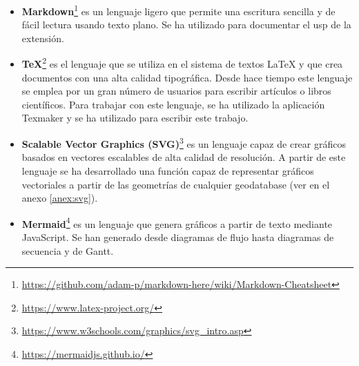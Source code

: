 \begin{itemize}
\item\textbf{Markdown}\footnote{\url{https://github.com/adam-p/markdown-here/wiki/Markdown-Cheatsheet}} es un lenguaje ligero que permite una escritura sencilla y de fácil lectura usando texto plano. Se ha utilizado para documentar el usp de la extensión.
\item\textbf{TeX}\footnote{\url{https://www.latex-project.org/}} es el lenguaje que se utiliza en el sistema de textos LaTeX y que crea documentos con una alta calidad tipográfica. Desde hace tiempo este lenguaje se emplea por un gran número de usuarios para escribir artículos o libros científicos. Para trabajar con este lenguaje, se ha utilizado la aplicación Texmaker y se ha utilizado para escribir este trabajo.
\item\textbf{Scalable Vector Graphics (SVG)}\footnote{\url{https://www.w3schools.com/graphics/svg_intro.asp}} es un lenguaje capaz de crear gráficos basados en vectores escalables de alta calidad de resolución. A partir de este lenguaje se ha desarrollado una función capaz de representar gráficos vectoriales a partir de las geometrías de cualquier geodatabase (ver en el anexo \ref{anex:svg}).
\item\textbf{Mermaid}\footnote{\url{https://mermaidjs.github.io/}} es un lenguaje que genera gráficos a partir de texto mediante JavaScript. Se han generado desde diagramas de flujo hasta diagramas de secuencia y de Gantt.
\end{itemize}
